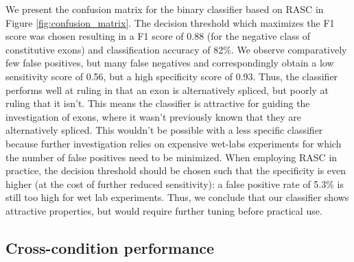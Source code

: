 We present the confusion matrix for the binary classifier based on RASC in Figure \ref{fig:confusion_matrix}. The decision threshold which maximizes the F1 score was chosen resulting in a F1 score of 0.88 (for the negative class of constitutive exons) and classification accuracy of 82\%. We observe comparatively few false positives, but many false negatives and correspondingly obtain a low sensitivity score of 0.56, but a high specificity score of 0.93. Thus, the classifier performs well at ruling in that an exon is alternatively spliced, but poorly at ruling that it isn't. This means the classifier is attractive for guiding the investigation of exons, where it wasn't previously known that they are alternatively spliced. This wouldn't be possible with a less specific classifier because further investigation relies on expensive wet-labs experiments for which the number of false positives need to be minimized. When employing RASC in practice, the decision threshold should be chosen such that the specificity is even higher (at the cost of further reduced sensitivity): a false positive rate of 5.3\% is still too high for wet lab experiments. Thus, we conclude that our classifier shows attractive properties, but would require further tuning before practical use. 





\subsection{Cross-condition performance} \label{subsec:hipsci_ipsc_majiq}

